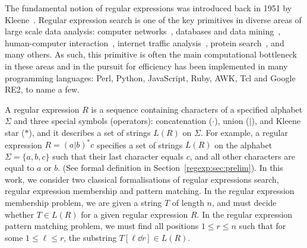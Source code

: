 
The fundamental notion of regular expressions was introduced back in 1951 by Kleene~\cite{RM-704}. Regular expression search is one of the key primitives in diverse areas of large scale data analysis: computer networks~\cite{10.1145/1159913.1159952}, databases and data mining~\cite{1000341,10.5555/645927.672035,10.1145/375551.375569}, human-computer interaction~\cite{10.1145/2207676.2208694}, internet traffic analysis~\cite{4221791,4579527}, protein search~\cite{10.1145/369133.369220}, and many others. As such, this primitive is often the main computational bottleneck in these areas and in the pursuit for efficiency has been implemented in many programming languages:
Perl, Python, JavaScript, Ruby, AWK, Tcl and Google RE2, to name a few.

A regular expression $R$ is a sequence containing characters of a specified alphabet $\Sigma$ and three special symbols (operators): concatenation ($\cdot$), union ($|$), and Kleene star ($\ast$), and it describes a set of strings $L(R)$ on $\Sigma$. For example, a regular expression $R = (a|b)^\ast c$ specifies a set of strings $L(R)$ on the alphabet $\Sigma = \{a,b,c\}$ such that their last character equals $c$, and all other characters are equal to $a$ or $b$. (See formal definition in Section~\ref{regexp:sec:prelim}). In this work, we consider two classical formalisations of regular expressions search, regular expression membership and pattern matching. In the regular expression membership problem, we are given a string $T$ of length $n$, and must decide whether $T \in L(R)$ for a given regular expression $R$. In the regular expression pattern matching problem, we must find all positions $1 \le r \le n$ such that for some $1 \le \ell \le r$, the substring $T[\ell \dd r] \in L(R)$. 

